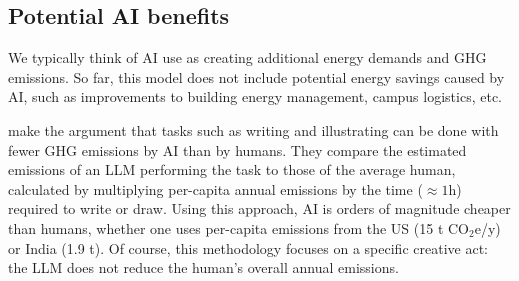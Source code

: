 \documentclass[11pt]{article}
\begin{document}
\subsection*{Potential AI benefits}

We typically think of AI use as creating additional energy demands and GHG emissions.
So far, this model does not include potential energy savings caused by AI, such as improvements
to building energy management, campus logistics, etc.

\textcite{tomlinson2024carbon} make the argument that tasks such as writing
and illustrating can be done with fewer GHG emissions by AI than by humans. They compare the
estimated emissions of an LLM performing the task to those of the average human, calculated
by multiplying per-capita annual emissions by the time ($\approx 1$h) required to write or draw.
Using this approach, AI is orders of magnitude cheaper than humans, whether one uses per-capita
emissions from the US (15 t CO$_2$e/y) or India (1.9 t). Of course, this methodology focuses on
a specific creative act: the LLM does not reduce the human's overall annual emissions.

\printbibliography
\end{document}
